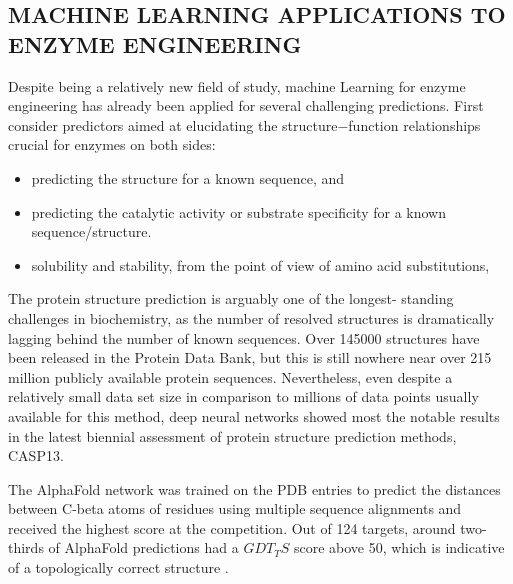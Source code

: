 \documentclass[12pt]{article}
\begin{document}
\subsection{MACHINE LEARNING APPLICATIONS TO ENZYME ENGINEERING}


Despite being a relatively new ﬁeld of study, machine Learning for enzyme engineering has already been applied for several challenging predictions. First consider predictors aimed at elucidating the structure−function relationships crucial for enzymes on both sides:

\begin{itemize}
\item predicting the structure for a known sequence, and 
\item predicting the catalytic activity or substrate speciﬁcity for a known sequence/structure. 
\item solubility and stability, from the point of view of amino acid substitutions,

\end{itemize}

The protein structure prediction is arguably one of the longest- standing challenges in biochemistry, as the number of resolved structures is dramatically lagging behind the number of known sequences. Over 145000 structures have been released in the Protein Data Bank, but this is still nowhere near over 215 million publicly available protein sequences\cite{28}. Nevertheless, even despite a relatively small data set size in comparison to millions of data points usually available for this method, deep neural networks showed most the notable results in the latest biennial assessment of protein structure prediction methods, CASP13. 

The AlphaFold network was trained on the PDB entries to predict the distances between C-beta atoms of residues using multiple sequence alignments\cite{60} and received the highest score at the competition. Out of 124 targets, around two-thirds of AlphaFold predictions had a $GDT_TS$ score above 50, which is indicative of a topologically correct structure \cite{61}.
\end{document}
